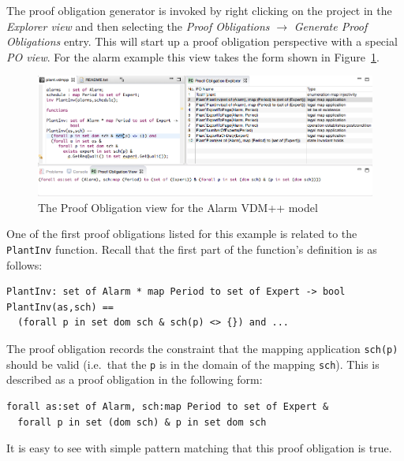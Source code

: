 The proof obligation generator is invoked by right clicking on the project in the \emph{Explorer view} and then selecting the \emph{Proof Obligations} $\rightarrow$ \emph{Generate Proof Obligations} entry. This will start up a proof obligation perspective with a special \emph{PO view}. For the alarm example this view takes the form shown in Figure~\ref{fig:POview}.
%
\begin{figure}[htbp]
\begin{center}
\includegraphics[width=4.5in]{figures/poview}
\caption{The Proof Obligation view for the Alarm VDM++ model\label{fig:POview}}
\end{center}
\end{figure}
%
One of the first proof obligations listed for this example is related to the \texttt{PlantInv} function. Recall that the first part of the function's definition is as follows:

\begin{lstlisting}
PlantInv: set of Alarm * map Period to set of Expert -> bool
PlantInv(as,sch) ==
  (forall p in set dom sch & sch(p) <> {}) and ...
\end{lstlisting}


The proof obligation records the constraint that the mapping application \texttt{sch(p)} should be valid (i.e.\ that the \texttt{p} is in the domain of the mapping \texttt{sch}). This is described as a proof obligation in the following form:

\begin{lstlisting}
forall as:set of Alarm, sch:map Period to set of Expert &
  forall p in set (dom sch) & p in set dom sch
\end{lstlisting}
It is easy to see with simple pattern matching that this proof obligation is true.

